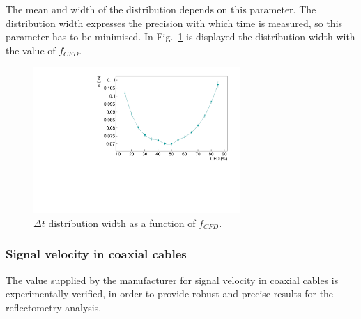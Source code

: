 The mean and width of the distribution depends on this parameter.
The distribution width expresses the precision with which time is measured, so this parameter has to be minimised.
In Fig.~\ref{fig:CFD_study} is displayed the distribution width with the value of $f_{CFD}$.
\begin{figure}[h!]
  \centering
  \includegraphics[width=0.7\textwidth]{commissioning/fig_commissioning/CFD_study.pdf}
  \caption{$\Delta t$ distribution width as a function of $f_{CFD}$.
    \label{fig:CFD_study}}
\end{figure}

\subsubsection*{Signal velocity in coaxial cables}

The value supplied by the manufacturer for signal velocity in coaxial cables is experimentally verified, in order to provide robust and precise results for the reflectometry analysis.

